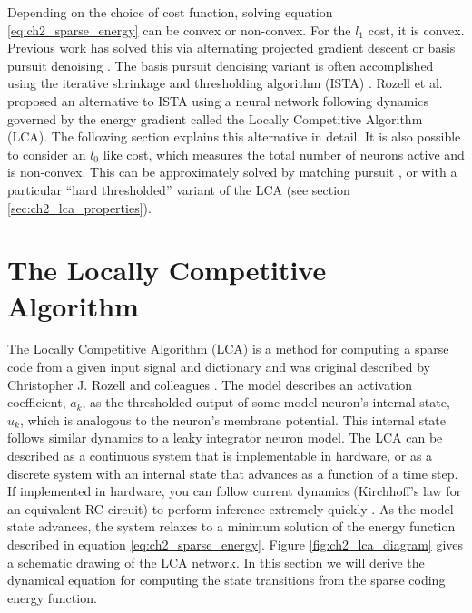 Depending on the choice of cost function, solving equation \eqref{eq:ch2_sparse_energy} can be convex or non-convex. For the $l_{1}$ cost, it is convex. Previous work has solved this via alternating projected gradient descent \parencite{olshausen1997sparse} or basis pursuit denoising \parencite{chen2001atomic}. The basis pursuit denoising variant is often accomplished using the iterative shrinkage and thresholding algorithm (ISTA) \parencite{daubechies2004iterative, beck2009fast}. Rozell et al. \citeyearpar{rozell2008sparse} proposed an alternative to ISTA using a neural network following dynamics governed by the energy gradient called the Locally Competitive Algorithm (LCA). The following section explains this alternative in detail. It is also possible to consider an $l_{0}$ like cost, which measures the total number of neurons active and is non-convex. This can be approximately solved by matching pursuit \parencite{davis1997adaptive, rehn2007network, rebollo2002optimized}, or with a particular ``hard thresholded'' variant of the LCA (see section \ref{sec:ch2_lca_properties}).


\section{The Locally Competitive Algorithm}\label{sec:ch2_lca}
The Locally Competitive Algorithm (LCA) is a method for computing a sparse code from a given input signal and dictionary and was original described by Christopher J. Rozell and colleagues \citeyearpar{rozell2008sparse}. The model describes an activation coefficient, $a_{k}$, as the thresholded output of some model neuron's internal state, $u_{k}$, which is analogous to the neuron's membrane potential. This internal state follows similar dynamics to a leaky integrator neuron model. The LCA can be described as a continuous system that is implementable in hardware, or as a discrete system with an internal state that advances as a function of a time step. If implemented in hardware, you can follow current dynamics (Kirchhoff's law for an equivalent RC circuit) to perform inference extremely quickly \parencite{rozell2008sparse}. As the model state advances, the system relaxes to a minimum solution of the energy function described in equation \eqref{eq:ch2_sparse_energy}. Figure \ref{fig:ch2_lca_diagram} gives a schematic drawing of the LCA network. In this section we will derive the dynamical equation for computing the state transitions from the sparse coding energy function.

